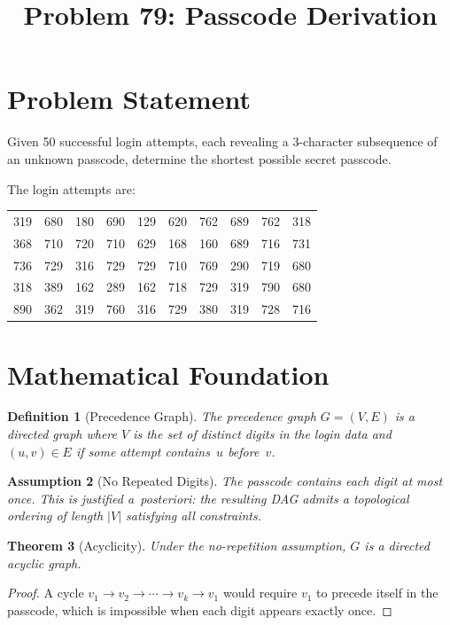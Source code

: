 \documentclass[11pt]{article}
\title{Problem 79: Passcode Derivation}
\author{}
\date{}
\newtheorem{theorem}{Theorem}
\newtheorem{definition}[theorem]{Definition}
\newtheorem{assumption}[theorem]{Assumption}
\begin{document}
\maketitle

\section{Problem Statement}

Given 50 successful login attempts, each revealing a 3-character subsequence of an unknown passcode, determine the shortest possible secret passcode.

The login attempts are:
\begin{center}
\begin{tabular}{cccccccccc}
319 & 680 & 180 & 690 & 129 & 620 & 762 & 689 & 762 & 318 \\
368 & 710 & 720 & 710 & 629 & 168 & 160 & 689 & 716 & 731 \\
736 & 729 & 316 & 729 & 729 & 710 & 769 & 290 & 719 & 680 \\
318 & 389 & 162 & 289 & 162 & 718 & 729 & 319 & 790 & 680 \\
890 & 362 & 319 & 760 & 316 & 729 & 380 & 319 & 728 & 716
\end{tabular}
\end{center}

\section{Mathematical Foundation}

\begin{definition}[Precedence Graph]
The \emph{precedence graph} $G = (V, E)$ is a directed graph where $V$ is the set of distinct digits in the login data and $(u, v) \in E$ if some attempt contains~$u$ before~$v$.
\end{definition}

\begin{assumption}[No Repeated Digits]
The passcode contains each digit at most once. This is justified a~posteriori: the resulting DAG admits a topological ordering of length $|V|$ satisfying all constraints.
\end{assumption}

\begin{theorem}[Acyclicity]
Under the no-repetition assumption, $G$ is a directed acyclic graph.
\end{theorem}

\begin{proof}
A cycle $v_1 \to v_2 \to \cdots \to v_k \to v_1$ would require $v_1$ to precede itself in the passcode, which is impossible when each digit appears exactly once.
\end{proof}
\end{document}
